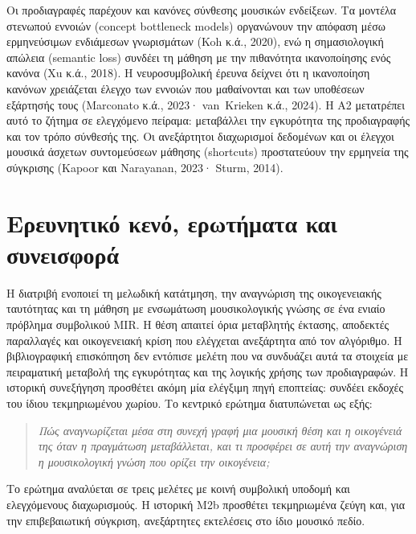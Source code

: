 \documentclass[a4paper]{article}
\begin{document}
Οι προδιαγραφές παρέχουν και κανόνες σύνθεσης μουσικών ενδείξεων. Τα μοντέλα στενωπού εννοιών (concept bottleneck models) οργανώνουν την απόφαση μέσω ερμηνεύσιμων ενδιάμεσων γνωρισμάτων (Koh κ.ά., 2020), ενώ η σημασιολογική απώλεια (semantic loss) συνδέει τη μάθηση με την πιθανότητα ικανοποίησης ενός κανόνα (Xu κ.ά., 2018). Η νευροσυμβολική έρευνα δείχνει ότι η ικανοποίηση κανόνων χρειάζεται έλεγχο των εννοιών που μαθαίνονται και των υποθέσεων εξάρτησής τους (Marconato κ.ά., 2023· van~Krieken κ.ά., 2024). Η Α2 μετατρέπει αυτό το ζήτημα σε ελεγχόμενο πείραμα: μεταβάλλει την εγκυρότητα της προδιαγραφής και τον τρόπο σύνθεσής της. Οι ανεξάρτητοι διαχωρισμοί δεδομένων και οι έλεγχοι μουσικά άσχετων συντομεύσεων μάθησης (shortcuts) προστατεύουν την ερμηνεία της σύγκρισης (Kapoor και Narayanan, 2023· Sturm, 2014).

\section{Ερευνητικό κενό, ερωτήματα και συνεισφορά}\label{sec:rq}
Η διατριβή ενοποιεί τη μελωδική κατάτμηση, την αναγνώριση της οικογενειακής ταυτότητας και τη μάθηση με ενσωμάτωση μουσικολογικής γνώσης σε ένα ενιαίο πρόβλημα συμβολικού MIR. Η θέση απαιτεί όρια μεταβλητής έκτασης, αποδεκτές παραλλαγές και οικογενειακή κρίση που ελέγχεται ανεξάρτητα από τον αλγόριθμο. Η βιβλιογραφική επισκόπηση δεν εντόπισε μελέτη που να συνδυάζει αυτά τα στοιχεία με πειραματική μεταβολή της εγκυρότητας και της λογικής χρήσης των προδιαγραφών. Η ιστορική συνεξήγηση προσθέτει ακόμη μία ελέγξιμη πηγή εποπτείας: συνδέει εκδοχές του ίδιου τεκμηριωμένου χωρίου. Το κεντρικό ερώτημα διατυπώνεται ως εξής:

\begin{quote}\itshape
Πώς αναγνωρίζεται μέσα στη συνεχή γραφή μια μουσική θέση και η οικογένειά της όταν η πραγμάτωση μεταβάλλεται, και τι προσφέρει σε αυτή την αναγνώριση η μουσικολογική γνώση που ορίζει την οικογένεια;
\end{quote}

\noindent Το ερώτημα αναλύεται σε τρεις μελέτες με κοινή συμβολική υποδομή και ελεγχόμενους διαχωρισμούς. Η ιστορική Μ2b προσθέτει τεκμηριωμένα ζεύγη και, για την επιβεβαιωτική σύγκριση, ανεξάρτητες εκτελέσεις στο ίδιο μουσικό πεδίο.
\end{document}
